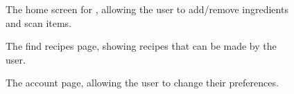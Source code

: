 \begin{figure}
  \centering
  
  \caption{The home screen for \chef{}, allowing the user to add/remove ingredients and scan items.}
\end{figure}

\begin{figure}
  \centering
  
  \caption{The find recipes page, showing recipes that can be made by the user. }
\end{figure}

\begin{figure}
  \centering
  
  \caption{The account page, allowing the user to change their preferences.}
\end{figure}
